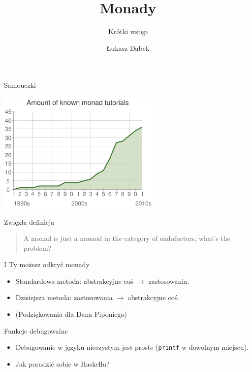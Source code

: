 \documentclass[14pt]{beamer}
\title{Monady}
\subtitle{Krótki wstęp}
\author{Łukasz Dąbek}
\begin{document}
\begin{frame}[plain]
    \titlepage
\end{frame}

\begin{frame}{Samouczki}
    \begin{center}
        \includegraphics[scale=0.5]{monads-timeline.png}
    \end{center}
\end{frame}

\begin{frame}{Zwięzła definicja}
    \begin{quote}
        A monad is just a monoid in the category of endofuctors,
        what's the problem?
        \vskip5mm
        \hspace*{} 
    \end{quote}
\end{frame}


\begin{frame}{I Ty możesz odkryć monady}
    \begin{itemize}
        \item Standardowa metoda: abstrakcyjne coś $\rightarrow$ zastosowania.
        \pause
        \item Dzisiejsza metoda: zastosowania $\rightarrow$ abstrakcyjne coś.
        \item (Podziękowania dla Dana Piponiego)
    \end{itemize}
\end{frame}

\begin{frame}{Funkcje debugowalne}
    \begin{itemize}
        \item Debugowanie w języku nieczystym jest proste
            (\texttt{printf} w dowolnym miejscu).
        \pause
        \item Jak poradzić sobie w Haskellu?
    \end{itemize}
\end{frame}
\end{document}
